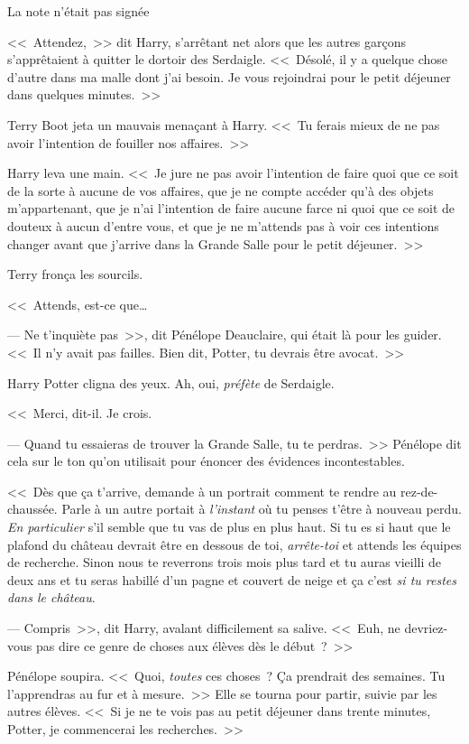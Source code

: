La note n'était pas signée

\later

<<~Attendez,~>> dit Harry, s'arrêtant net alors que les autres garçons s'apprêtaient à quitter le dortoir des Serdaigle. <<~Désolé, il y a quelque chose d'autre dans ma malle dont j'ai besoin. Je vous rejoindrai pour le petit déjeuner dans quelques minutes.~>>

Terry Boot jeta un mauvais menaçant à Harry. <<~Tu ferais mieux de ne pas avoir l'intention de fouiller nos affaires.~>>

Harry leva une main. <<~Je jure ne pas avoir l'intention de faire quoi que ce soit de la sorte à aucune de vos affaires, que je ne compte accéder qu'à des objets m'appartenant, que je n'ai l'intention de faire aucune farce ni quoi que ce soit de douteux à aucun d'entre vous, et que je ne m'attends pas à voir ces intentions changer avant que j'arrive dans la Grande Salle pour le petit déjeuner.~>>

Terry fronça les sourcils.

<<~Attends, est-ce que…

--- Ne t'inquiète pas~>>, dit Pénélope Deauclaire, qui était là pour les guider. <<~Il n'y avait pas failles. Bien dit, Potter, tu devrais être avocat.~>>

Harry Potter cligna des yeux. Ah, oui, \emph{préfète} de Serdaigle.

<<~Merci, dit-il. Je crois.

--- Quand tu essaieras de trouver la Grande Salle, tu te perdras.~>> Pénélope dit cela sur le ton qu'on utilisait pour énoncer des évidences incontestables.

<<~Dès que ça t'arrive, demande à un portrait comment te rendre au rez-de-chaussée. Parle à un autre portait à \emph{l'instant} où tu penses t'être à nouveau perdu. \emph{En particulier} s'il semble que tu vas de plus en plus haut. Si tu es si haut que le plafond du château devrait être en dessous de toi, \emph{arrête-toi} et attends les équipes de recherche. Sinon nous te reverrons trois mois plus tard et tu auras vieilli de deux ans et tu seras habillé d'un pagne et couvert de neige et ça c'est \emph{si tu restes dans le château}.

--- Compris~>>, dit Harry, avalant difficilement sa salive. <<~Euh, ne devriez-vous pas dire ce genre de choses aux élèves dès le début~?~>>

Pénélope soupira. <<~Quoi, \emph{toutes} ces choses~? Ça prendrait des semaines. Tu l'apprendras au fur et à mesure.~>> Elle se tourna pour partir, suivie par les autres élèves. <<~Si je ne te vois pas au petit déjeuner dans trente minutes, Potter, je commencerai les recherches.~>>

